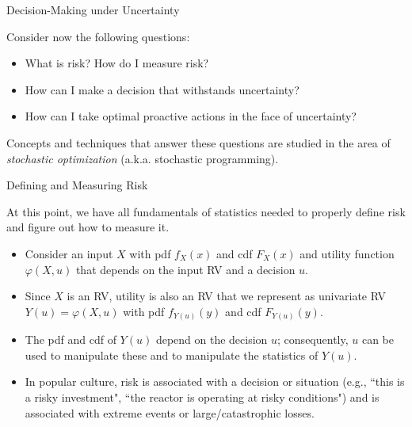 \documentclass[9pt]{beamer}
\begin{document}
%
\begin{frame}{Decision-Making under Uncertainty}

Consider now the following questions:

\begin{block}{}
\begin{itemize}
   \setlength{\itemsep}{10pt}
\item What is risk? How do I measure risk?
\item How can I make a decision that withstands uncertainty?
\item How can I take optimal proactive actions in the face of uncertainty?
\end{itemize}
\end{block}
Concepts and techniques that answer these questions are studied in the area of {\em stochastic optimization} (a.k.a. stochastic programming). 


\end{frame}

%
\begin{frame}{Defining and Measuring Risk}

At this point, we have all fundamentals of statistics needed to properly define risk and figure out how to measure it.

\begin{itemize}
   \setlength{\itemsep}{10pt}
\item Consider an input $X$ with pdf $f_X(x)$ and cdf $F_X(x)$ and utility function $\varphi(X,u)$ that depends on the input RV and a decision $u$. 

\item Since $X$ is an RV, utility is also an RV that we represent as univariate RV $Y(u)=\varphi(X,u)$ with pdf $f_{Y(u)}(y)$ and cdf $F_{Y(u)}(y)$. 

\item The pdf and cdf of $Y(u)$ depend on the decision $u$; consequently, $u$ can be used to manipulate these and to manipulate the statistics of $Y(u)$. 

\item In popular culture, risk is associated with a decision or situation (e.g., ``this is a risky investment", ``the reactor is operating at risky conditions") and is associated with extreme events or large/catastrophic losses.    

\end{itemize}

\end{frame}
\end{document}

